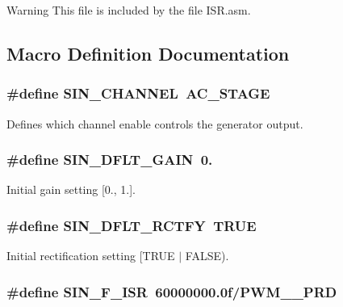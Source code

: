 \begin{DoxyWarning}{Warning}
This file is included by the file I\-S\-R.\-asm. 
\end{DoxyWarning}


\subsection{Macro Definition Documentation}
\hypertarget{a00045_a71b6211a4d077af219d7e503f17114d1}{
\subsubsection[{S\-I\-N\-\_\-\-C\-H\-A\-N\-N\-E\-L}]{\setlength{\rightskip}{0pt plus 5cm}\#define S\-I\-N\-\_\-\-C\-H\-A\-N\-N\-E\-L~{\bf A\-C\-\_\-\-S\-T\-A\-G\-E}}}\label{a00045_a71b6211a4d077af219d7e503f17114d1}
Defines which channel enable controls the generator output. \hypertarget{a00045_aa63a6918009b4e4381e359cee2f05eef}{
\subsubsection[{S\-I\-N\-\_\-\-D\-F\-L\-T\-\_\-\-G\-A\-I\-N}]{\setlength{\rightskip}{0pt plus 5cm}\#define S\-I\-N\-\_\-\-D\-F\-L\-T\-\_\-\-G\-A\-I\-N~0.}}\label{a00045_aa63a6918009b4e4381e359cee2f05eef}
Initial gain setting \mbox{[}0., 1.\mbox{]}. \hypertarget{a00045_afc105af9d8f851266d0b8e8ffe57931a}{
\subsubsection[{S\-I\-N\-\_\-\-D\-F\-L\-T\-\_\-\-R\-C\-T\-F\-Y}]{\setlength{\rightskip}{0pt plus 5cm}\#define S\-I\-N\-\_\-\-D\-F\-L\-T\-\_\-\-R\-C\-T\-F\-Y~T\-R\-U\-E}}\label{a00045_afc105af9d8f851266d0b8e8ffe57931a}
Initial rectification setting \mbox{[}T\-R\-U\-E $|$ F\-A\-L\-S\-E). \hypertarget{a00045_af54d156f326804e0c3d80e0b709d3406}{
\subsubsection[{S\-I\-N\-\_\-\-F\-\_\-\-I\-S\-R}]{\setlength{\rightskip}{0pt plus 5cm}\#define S\-I\-N\-\_\-\-F\-\_\-\-I\-S\-R~60000000.\-0f/\-P\-W\-M\-\_\-\_\-\-P\-R\-D}}\label{a00045_af54d156f326804e0c3d80e0b709d3406}
